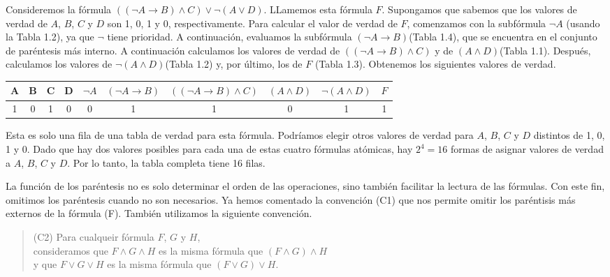 \message{ !name(main.tex)}\documentclass[12pt,a4paper]{book}
\begin{document}
    \begin{ejemplo}
        Consideremos la fórmula $((\neg A\rightarrow B)\wedge C)\vee\neg(A\vee D)$. LLamemos esta fórmula $F$. Supongamos que sabemos que los valores de verdad de
        $A$, $B$, $C$ y $D$ son 1, 0, 1 y 0, respectivamente. Para calcular el valor de verdad de $F$, comenzamos con la subfórmula $\neg A$ (usando la Tabla 1.2),
        ya que $\neg$ tiene prioridad. A continuación, evaluamos la subfórmula $(\neg A\rightarrow B)$(Tabla 1.4), que se encuentra en el conjunto de paréntesis
        más interno. A continuación calculamos los valores de verdad de $((\neg A\rightarrow B)\wedge C)$ y de $(A\wedge D)$(Tabla 1.1). Después, calculamos los
        valores de $\neg(A\wedge D)$(Tabla 1.2) y, por último, los de $F$ (Tabla 1.3). Obtenemos los siguientes valores de verdad.

        \begin{table}[htbp]
            \renewcommand{\arraystretch}{1.5}
            \setlength{\tabcolsep}{10pt}
            \begin{tabular}{c |c |c |c |c |c |c |c |c |c}
                A & B & C & D & $\neg A$ & $(\neg A\rightarrow B)$ & $((\neg A\rightarrow B)\wedge C)$ & $(A\wedge D)$ & $\neg (A\wedge D)$ & $F$\\
                \hline
                1 & 0 & 1 & 0 & 0 & 1 & 1 & 0 & 1 & 1
            \end{tabular}
        \end{table}

        Esta es solo una fila de una tabla de verdad para esta fórmula. Podríamos elegir otros valores de verdad para $A$, $B$, $C$ y $D$ distintos de
        1, 0, 1 y 0. Dado que hay dos valores posibles para cada una de estas cuatro fórmulas atómicas, hay $2^{4}=16$ formas de asignar valores de verdad
        a $A$, $B$, $C$ y $D$. Por lo tanto, la tabla completa tiene 16 filas.
    \end{ejemplo}

    La función de los paréntesis no es solo determinar el orden de las operaciones, sino también facilitar la lectura de las fórmulas. Con este fin, omitimos los paréntesis
    cuando no son necesarios. Ya hemos comentado la convención (C1) que nos permite omitir los paréntisis más externos de la fórmula (F). También utilizamos
    la siguiente convención.

    \begin{quote}
        (C2) Para cualqueir fórmula $F$, $G$ y $H$,\\
        consideramos que $F\wedge G\wedge H$ es la misma fórmula que $(F\wedge G)\wedge H$\\
        y que $F\vee G\vee H$ es la misma fórmula que $(F\vee G)\vee H$.
    \end{quote}
\end{document}
